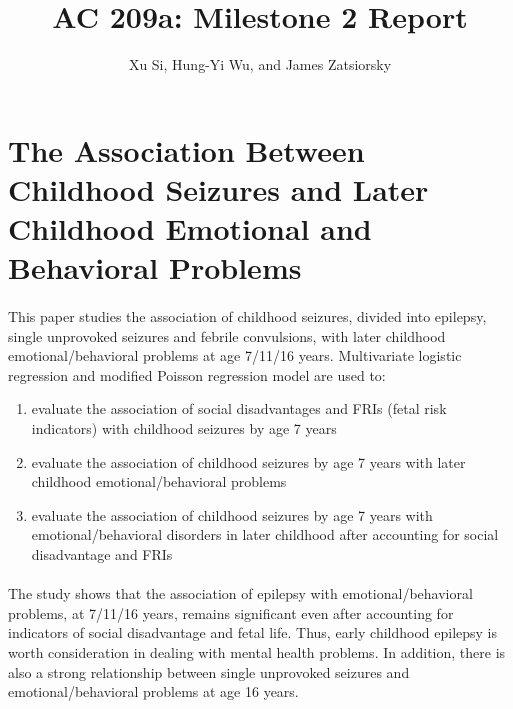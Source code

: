 \documentclass[10pt,letter]{article}
\begin{document}


\title{AC 209a: Milestone 2 Report}

\author{Xu Si,  Hung-Yi Wu, and James Zatsiorsky}

 
\maketitle 


\section{The Association Between Childhood Seizures and Later Childhood Emotional and Behavioral Problems}

\paragraph{} This paper studies the association of childhood seizures, divided into epilepsy, single unprovoked seizures and febrile
convulsions, with later childhood emotional/behavioral problems at age 7/11/16 years. Multivariate logistic regression and modified Poisson regression model are used to:
\begin{enumerate}
	\item evaluate the association of social disadvantages and FRIs (fetal risk indicators) with childhood seizures by age 7 years
	\item evaluate the association of childhood seizures by age 7 years with later childhood emotional/behavioral problems
	\item evaluate the association of childhood seizures by age 7 years with emotional/behavioral disorders in later childhood after accounting for social disadvantage and FRIs
\end{enumerate}

\paragraph{} The study shows that the association of epilepsy with emotional/behavioral problems, at 7/11/16 years, remains significant
even after accounting for indicators of social disadvantage and fetal life. Thus, early childhood epilepsy is worth
consideration in dealing with mental health problems. In addition, there is also a strong relationship between single
unprovoked seizures and emotional/behavioral problems at age 16 years.
\end{document}
